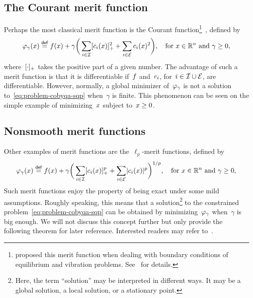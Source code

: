 \subsection{The Courant merit function}

Perhaps the most classical merit function is the Courant function\footnote{\citeauthor{Courant_1943} proposed this merit function when dealing with boundary conditions of equilibrium and vibration problems. See~\cite[Pt.~II, \S~3]{Courant_1943} for details.}~\cite{Courant_1943}, defined by
\begin{equation*}
    \merit_{\gamma}(\iter) \eqdef \obj(\iter) + \gamma \bigg( \sum_{i \in \iub} \posp{\con{i}(\iter)}^2 + \sum_{i \in \ieq} \con{i}(\iter)^2 \bigg), \quad \text{for~$x \in \R^n$ and~$\gamma \ge 0$,}
\end{equation*}
%
where~$[\cdot]_+$ takes the positive part of a given number.
The advantage of such a merit function is that it is differentiable if~$f$ and~$c_{i}$, for~$i \in \mathcal{I} \cup \mathcal{E}$, are differentiable.
However, normally, a global minimizer of~$\merit_{\gamma}$ is not a solution to~\cref{eq:problem-cobyqa-sqp} when~$\gamma$ is finite.
This phenomenon can be seen on the simple example of minimizing~$\iter$ subject to~$\iter \ge 0$.

\subsection{Nonsmooth merit functions}

Other examples of merit functions are the~$\ell_p$-merit functions, defined by
\begin{equation*}
    \merit_{\gamma}(\iter) \eqdef \obj(\iter) + \gamma \bigg( \sum_{i \in \iub} \posp{\con{i}(\iter)}^p + \sum_{i \in \ieq} \abs{\con{i}(\iter)}^p \bigg)^{1/p}, \quad \text{for~$\iter \in \R^n$ and~$\gamma \ge 0$,}
\end{equation*}
Such merit functions enjoy the property of being exact under some mild assumptions.
Roughly speaking, this means that a solution\footnote{Here, the term \enquote{solution} may be interpreted in different ways. It may be a global solution, a local solution, or a stationary point.} to the constrained problem~\cref{eq:problem-cobyqa-sqp} can be obtained by minimizing~$\merit_{\gamma}$ when~$\gamma$ is big enough.
We will not discuss this concept further but only provide the following theorem for later reference.
Interested readers may refer to~\cite{Han_Mangasarian_1979,Mayne_1980,Pillo_Grippo_1989}.

